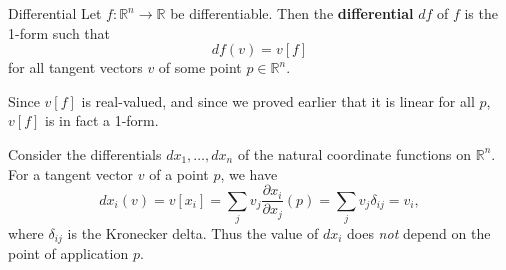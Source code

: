 \documentclass[10pt]{report}
\begin{document}
\begin{defn}{Differential}{}
Let $f:\mathbb{R}^n\to \mathbb{R}$ be differentiable. Then the \textbf{differential} $df$ of $f$ is the 1-form such that
\[
	df(v) = v[f]
\] for all tangent vectors $v$ of some point $p \in \mathbb{R}^n$.
\end{defn}

Since $v[f]$ is real-valued, and since we proved earlier that it is linear for all $p$, $v[f]$ is in fact a 1-form.

\begin{ex}{}{}
Consider the differentials $dx_1, \dots, dx_n$ of the natural coordinate functions on $\mathbb{R}^n$. For a tangent vector $v$ of a point $p$, we have
\[
	dx_i(v) = v[x_i] = \sum_j v_j \frac{\partial x_i}{\partial x_j} (p) = \sum_j v_j \delta_{ij} = v_i,
\] where $\delta_{ij}$ is the Kronecker delta. Thus the value of $dx_i$ does \textit{not} depend on the point of application $p$.
\end{ex}
\end{document}
